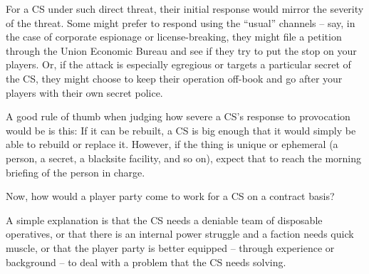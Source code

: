 For a CS under such direct threat, their initial response would mirror the severity of the threat.
Some might prefer to respond using the ``usual'' channels -- say, in the case of corporate
espionage or license-breaking, they might file a petition through the Union Economic Bureau and
see if they try to put the stop on your players. Or, if the attack is especially egregious or targets a
particular secret of the CS, they might choose to keep their operation off-book and go after your
players with their own secret police.

A good rule of thumb when judging how severe a CS's response to provocation would be is this: If
it can be rebuilt, a CS is big enough that it would simply be able to rebuild or replace it. However,
if the thing is unique or ephemeral (a person, a secret, a blacksite facility, and so on), expect that
to reach the morning briefing of the person in charge.

Now, how would a player party come to work for a CS on a contract basis?

A simple explanation is that the CS needs a deniable team of disposable operatives, or that there
is an internal power struggle and a faction needs quick muscle, or that the player party is better
equipped -- through experience or background -- to deal with a problem that the CS needs
solving.